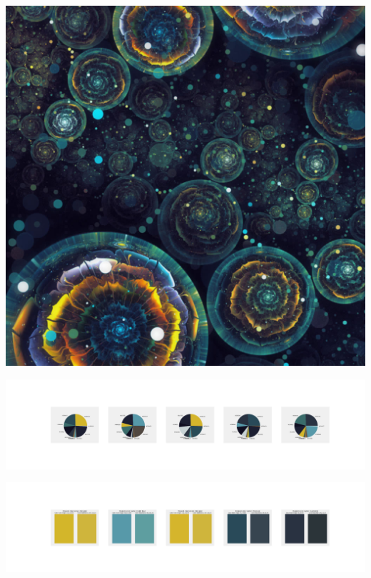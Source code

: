 \documentclass[11pt]{article}
\begin{document}
\begin{landscape}
    \begin{center}
    \includegraphics[width=\textwidth]{./nbimg/file (369).jpg}
    \end{center}

    \begin{center}
    \includegraphics[width=250mm]{./nbimg/pie-299.jpg}
    \end{center}

    \begin{center}
    \includegraphics[width=250mm]{./nbimg/peak-299.jpg}
    \end{center}
    


\end{landscape}
\end{document}
